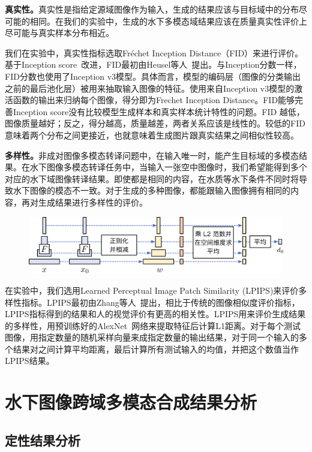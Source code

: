 \textbf{真实性。}真实性是指给定源域图像作为输入，生成的结果应该与目标域中的分布尽可能的相同。在我们的实验中，生成的水下多模态域结果应该在质量真实性评价上尽可能与真实样本分布相近。

我们在实验中，真实性指标选取Fréchet Inception Distance（FID）来进行评价。基于Inception score~\cite{salimans2016improved}改进，FID最初由Heusel等人~\cite{heusel2017gans}提出。与Inception分数一样，FID分数也使用了Inception v3模型。具体而言，模型的编码层（图像的分类输出之前的最后池化层）被用来抽取输入图像的特征。使用来自Inception v3模型的激活函数的输出来归纳每个图像，得分即为Frechet Inception Distance。FID能够完善Inception score没有比较模型生成样本和真实样本统计特性的问题。FID 越低，图像质量越好；反之，得分越高，质量越差，两者关系应该是线性的。较低的FID意味着两个分布之间更接近，也就意味着生成图片跟真实结果之间相似性较高。

\textbf{多样性。}非成对图像多模态转译问题中，在输入唯一时，能产生目标域的多模态结果。在水下图像多模态转译任务中，当输入一张空中图像时，我们希望能得到多个对应的水下域图像转译结果。即使都是相同的内容，在水质等水下条件不同时将导致水下图像的模态不一致。对于生成的多种图像，都能跟输入图像拥有相同的内容，再对生成结果进行多样性的评价。

\begin{figure}[htp]
    \centering
	\includegraphics[width=\textwidth]{figures/LPIPS.pdf}
	\caption{}
	\label{fig:lpips}
\end{figure}

在实验中，我们选用Learned Perceptual Image Patch Similarity (LPIPS)来评价多样性指标。LPIPS最初由Zhang等人~\cite{zhang2018perceptual}提出，相比于传统的图像相似度评价指标，LPIPS指标得到的结果和人的视觉评价有更高的相关性。LPIPS用来评价生成结果的多样性，用预训练好的AlexNet~\cite{krizhevsky2017imagenet}网络来提取特征后计算L1距离。对于每个测试图像，用指定数量的随机采样向量来成指定数量的输出结果，对于同一个输入的多个结果对之间计算平均距离，最后计算所有测试输入的均值，并把这个数值当作LPIPS结果。

\section{水下图像跨域多模态合成结果分析}
\subsection{定性结果分析}

